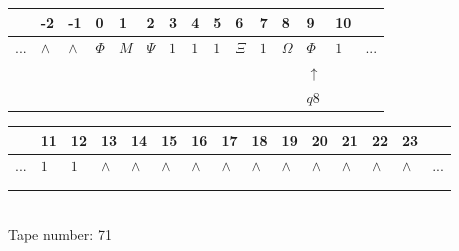 \documentclass[11pt]{article}
\begin{document}
\begin{table}[H]
\centering
\begin{tabular}{lllllllllllllll}
 & -2 & -1 & 0 & 1 & 2 & 3 & 4 & 5 & 6 & 7 & 8 & 9 & 10 & \\
\hline
$...$ & \multicolumn{1}{|l|}{$\wedge$} & \multicolumn{1}{|l|}{$\wedge$} & \multicolumn{1}{|l|}{$\Phi$} & \multicolumn{1}{|l|}{$M$} & \multicolumn{1}{|l|}{$\Psi$} & \multicolumn{1}{|l|}{$1$} & \multicolumn{1}{|l|}{$1$} & \multicolumn{1}{|l|}{$1$} & \multicolumn{1}{|l|}{$\Xi$} & \multicolumn{1}{|l|}{$1$} & \multicolumn{1}{|l|}{$\Omega$} & \multicolumn{1}{|l|}{$\Phi$} & \multicolumn{1}{|l|}{$1$} & $...$\\
\hline
&  &  &  &  &  &  &  &  &  &  &  & $\uparrow$ &  &  \\
&  &  &  &  &  &  &  &  &  &  &  & $ q8 $ &  &  \\
\end{tabular}
\begin{tabular}{lllllllllllllll}
 & 11 & 12 & 13 & 14 & 15 & 16 & 17 & 18 & 19 & 20 & 21 & 22 & 23 & \\
\hline
$...$ & \multicolumn{1}{|l|}{$1$} & \multicolumn{1}{|l|}{$1$} & \multicolumn{1}{|l|}{$\wedge$} & \multicolumn{1}{|l|}{$\wedge$} & \multicolumn{1}{|l|}{$\wedge$} & \multicolumn{1}{|l|}{$\wedge$} & \multicolumn{1}{|l|}{$\wedge$} & \multicolumn{1}{|l|}{$\wedge$} & \multicolumn{1}{|l|}{$\wedge$} & \multicolumn{1}{|l|}{$\wedge$} & \multicolumn{1}{|l|}{$\wedge$} & \multicolumn{1}{|l|}{$\wedge$} & \multicolumn{1}{|l|}{$\wedge$} & $...$\\
\hline
&  &  &  &  &  &  &  &  &  &  &  &  &  &  \\
&  &  &  &  &  &  &  &  &  &  &  &  &  &  \\
\end{tabular}
\\
Tape number: 71
\noindent\makebox[\linewidth]{\hdashrule{\textwidth}{1pt}{1pt}}\end{table}
\clearpage
\end{document}

